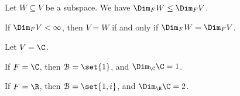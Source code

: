 \documentclass[10pt]{mypackage}
\begin{document}
\begin{corollary}
  Let $W\subseteq V$ be a subspace. We have $\Dim_{F}W \leq \Dim_{F} V$.\newline

  If $\Dim_{F} V < \infty$, then $V = W$ if and only if $\Dim_{F} W = \Dim_{F} V$.
\end{corollary}
\begin{example}
  Let $V = \C$.\newline

  If $F = \C$, then $\mathcal{B} = \set{1}$, and $\Dim_{\C}\C = 1$.\newline

  If $F = \R$, then $\mathcal{B} = \set{1,i}$, and $\Dim_{\R}\C = 2$.

\end{example}
\end{document}
